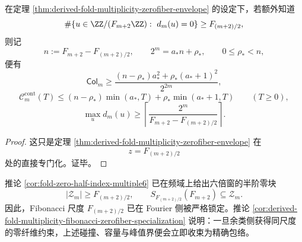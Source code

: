 \begin{corollary}\label{cor:derived-fold-multiplicity-fibonacci-zerofiber-specialization}
在定理 \ref{thm:derived-fold-multiplicity-zerofiber-envelope} 的设定下，若额外知道
\[
\#\{u\in \ZZ/(F_{m+2}\ZZ):\ d_m(u)=0\}\ge F_{(m+2)/2},
\]
则记
\[
n:=F_{m+2}-F_{(m+2)/2},
\qquad
2^m=a_\ast n+\rho_\ast,
\qquad
0\le \rho_\ast<n,
\]
便有
\[
\mathsf{Col}_m
\ge
\frac{(n-\rho_\ast)a_\ast^2+\rho_\ast(a_\ast+1)^2}{2^{2m}},
\]
\[
\mathcal C_m^{\mathrm{cont}}(T)
\le
(n-\rho_\ast)\min(a_\ast,T)+\rho_\ast\min(a_\ast+1,T)
\qquad (T\ge 0),
\]
\[
\max_u d_m(u)\ge \left\lceil\frac{2^m}{F_{m+2}-F_{(m+2)/2}}\right\rceil.
\]
\end{corollary}
\begin{proof}
这只是定理 \ref{thm:derived-fold-multiplicity-zerofiber-envelope} 在
\[
z=F_{(m+2)/2}
\]
处的直接专门化。证毕。
\end{proof}

\begin{remark}[与六倍窗半阶零块的接口]\label{rem:derived-fold-multiplicity-zerofiber-vs-spectral-zero}
推论 \ref{cor:fold-zero-half-index-multiple6} 已在频域上给出六倍窗的半阶零块
\[
|\mathcal Z_m|\ge F_{(m+2)/2},
\qquad
S_{F_{(m+2)/2}}(F_{m+2})\subseteq \mathcal Z_m.
\]
因此，Fibonacci 尺度 \(F_{(m+2)/2}\) 已在 Fourier 侧被严格锁定。推论 \ref{cor:derived-fold-multiplicity-fibonacci-zerofiber-specialization} 说明：一旦余类侧获得同尺度的零纤维约束，上述碰撞、容量与峰值界便会立即收束为精确包络。
\end{remark}
